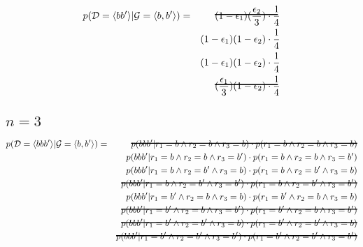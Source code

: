 \documentclass[a4paper,12pt]{article}
\newcommand\hcancel[2][black]{\setbox0=\hbox{$#2$}%
\rlap{\raisebox{.45\ht0}{\textcolor{#1}{\rule{\wd0}{1pt}}}}#2}
\begin{document}
\begin{eqnarray*}
p(\mathcal{D} = \langle bb' \rangle| \mathcal{G} = \langle b,b' \rangle) & = & \hcancel{ ( 1-\epsilon_1) (\frac{ \epsilon_2} {3})     \cdot \frac {1} {4} }\\            
                                                                         &   &  ( 1-\epsilon_1)( 1-\epsilon_2)    \cdot  \frac {1} {4} \\            
                                                                         &   &  ( 1-\epsilon_1)( 1-\epsilon_2)   \cdot  \frac {1} {4} \\            
                                                                         &   & \hcancel{ (\frac{ \epsilon_1} {3}) ( 1-\epsilon_2)       \cdot  \frac {1} {4}} \\            
\end{eqnarray*}

\subsection{$n=3$}

\begin{eqnarray*}
p(\mathcal{D} = \langle bbb' \rangle| \mathcal{G} = \langle b,b' \rangle) & = &  \hcancel{p( bbb' | r_1 = b  \land r_2 = b \land r_3 = b ) \cdot p( r_1 = b  \land r_2 = b \land r_3 = b  ) } \\
                                                                          &   &  p( bbb' | r_1 = b  \land r_2 = b \land r_3 = b' ) \cdot p( r_1 = b  \land r_2 = b \land r_3 = b'  ) \\
                                                                          &   &  p( bbb' | r_1 = b  \land r_2 = b' \land r_3 = b ) \cdot p( r_1 = b  \land r_2 = b' \land r_3 = b  ) \\
                                                                          &   &  \hcancel{p( bbb' | r_1 = b  \land r_2 = b' \land r_3 = b' ) \cdot p( r_1 = b  \land r_2 = b' \land r_3 = b'  ) }\\
%                                                                         
                                                                          &   &  p( bbb' | r_1 = b'  \land r_2 = b \land r_3 = b ) \cdot p( r_1 = b'  \land r_2 = b \land r_3 = b  ) \\
                                                                          &   &  \hcancel{p( bbb' | r_1 = b'  \land r_2 = b \land r_3 = b' ) \cdot p( r_1 = b'  \land r_2 = b \land r_3 = b'  )} \\
                                                                          &   &  \hcancel{p( bbb' | r_1 = b'  \land r_2 = b' \land r_3 = b ) \cdot p( r_1 = b'  \land r_2 = b' \land r_3 = b  )} \\
                                                                          &   &  \hcancel{p( bbb' | r_1 = b'  \land r_2 = b' \land r_3 = b' ) \cdot p( r_1 = b'  \land r_2 = b' \land r_3 = b'  ) } \\
\end{eqnarray*}
\end{document}
